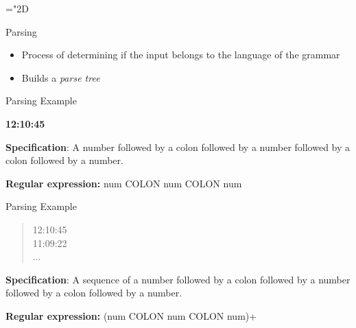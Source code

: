 \documentclass{beamer}
\begin{document}
\mathchardef\mhyphen="2D

\begin{frame}[fragile]{Parsing}

\begin{itemize}
	\item Process of determining if the input belongs to the language of the grammar	
	\item Builds a \textit{parse tree}
\end{itemize}
\end{frame}

\begin{frame}[fragile]{Parsing}
{Example}
\begin{center}
\textbf{12:10:45}
\end{center}

\textbf{Specification}: A number followed by a colon followed by a number followed by a colon followed by a number.

\textbf{Regular expression:} num COLON num COLON num

\end{frame}

\begin{frame}[fragile]{Parsing}
{Example}
\begin{quote}
12:10:45 \\
11:09:22 \\
...
\end{quote}

\textbf{Specification}: A sequence of a number followed by a colon followed by a number followed by a colon followed by a number.

\textbf{Regular expression:} (num COLON num COLON num)+

\end{frame}
\end{document}
